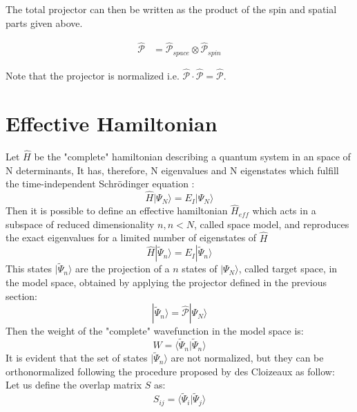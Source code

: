 \documentclass[12pt,twoside]{report}
\begin{document}
	The total projector can then be written as the product of the spin
	and spatial parts given above.

	\begin{equation}
		\begin{split}
			\hat{\mathcal{P}} & = \hat{\mathcal{P}}_{space}\otimes\hat{\mathcal{P}}_{spin}
		\end{split}
		\label{eq:demodel}
	\end{equation}

	Note that the projector is normalized i.e.
	$\hat{\mathcal{P}}\cdot\hat{\mathcal{P}} = \hat{\mathcal{P}}$.

	\section{Effective Hamiltonian}
	Let $\hat{H}$ be the "complete" hamiltonian describing a quantum system in an space of N determinants, It has, therefore, N eigenvalues and N eigenstates which fulfill the time-independent Schrödinger equation :
	\begin{equation}
	    \hat{H} |\Psi_N\rangle=E_I|\Psi_N\rangle
	\end{equation}
	Then it is possible to define an effective hamiltonian $\hat{H}_{eff}$ which acts in a subspace of reduced dimensionality $n, n<N$, called space model, and reproduces the exact eigenvalues for a limited number of eigenstates of $\hat{H}$
	\begin{equation}
	    \hat{H} |\tilde{\Psi}_n\rangle=E_I|\tilde{\Psi}_n\rangle
	\end{equation}
	This states $|\tilde{\Psi}_n\rangle$ are the projection of a $n$ states of $|\Psi_N\rangle$, called target space, in the model space, obtained by applying the projector defined in the previous section:
	\begin{equation}
	    |\tilde{\Psi}_n\rangle=\hat{\mathcal{P}}|\Psi_N\rangle
	\end{equation}
	Then the weight of the "complete" wavefunction in the model space is:
	\begin{equation}
	    W=\langle \tilde{\Psi}_n|\tilde{\Psi}_n\rangle 
	\end{equation}
	It is evident that the set of states $|\tilde{\Psi}_n\rangle$ are not normalized, but they can be orthonormalized following the procedure proposed by  des Cloizeaux \cite{Cloizeaux} as follow:\\
	Let us define the overlap matrix $S$ as:
	\begin{equation}
	   S_{ij}= \langle \tilde{\Psi}_i|\tilde{\Psi}_j\rangle 
	\end{equation}
\end{document}
